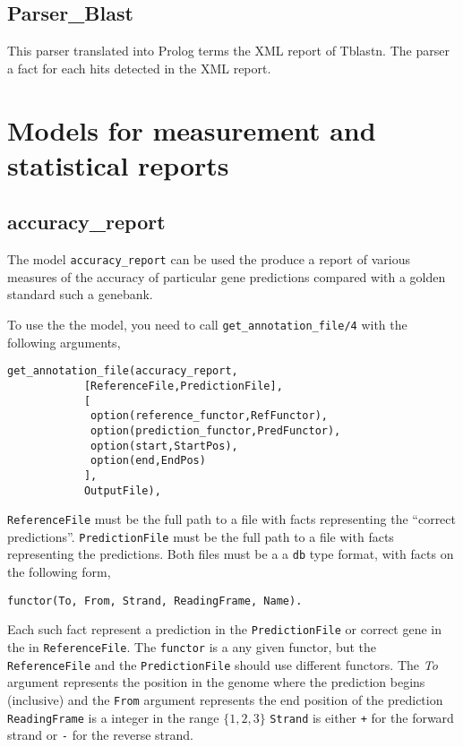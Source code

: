 \documentclass{book}
\begin{document}
\subsection{Parser\_Blast}

This parser translated into Prolog terms the XML report of Tblastn. The parser a fact for
each hits detected in the XML report.


\section{Models for measurement and statistical reports}

\subsection{accuracy\_report}

The model \texttt{accuracy\_report} can be used the produce a report of
various measures of the accuracy of particular gene predictions
compared with a golden standard such a genebank. 

To use the the model, you need to call
\texttt{get\_annotation\_file/4} with the following arguments,
\begin{verbatim}
get_annotation_file(accuracy_report,
		    [ReferenceFile,PredictionFile],
		    [
		     option(reference_functor,RefFunctor),
		     option(prediction_functor,PredFunctor),
		     option(start,StartPos),
		     option(end,EndPos)
		    ],
		    OutputFile),
\end{verbatim}

\texttt{ReferenceFile} must be the full path to a file with facts
representing the ``correct predictions''.  
\texttt{PredictionFile} must be the full path to a file with facts
representing the predictions. Both files must be a a \texttt{db} type 
format, with facts on the following form,
\begin{verbatim}
functor(To, From, Strand, ReadingFrame, Name).
\end{verbatim}

Each such fact represent a prediction in the \texttt{PredictionFile} or
correct gene in the in \texttt{ReferenceFile}. 
The \texttt{functor} is a any given functor, but the
\texttt{ReferenceFile} and the \texttt{PredictionFile} should use
different functors. The \emph{To} argument represents the position in
the genome where the prediction begins (inclusive) and the
\texttt{From} argument represents the end position of the prediction
\texttt{ReadingFrame} is a integer in the range $\{1,2,3\}$
\texttt{Strand} is either \texttt{+} for the forward strand or
    \texttt{-} for the reverse strand. 
\end{document}

